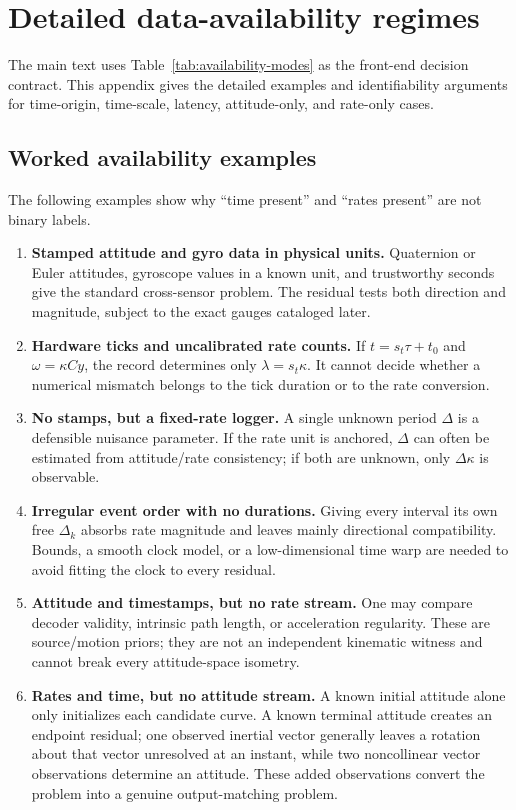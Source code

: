 \documentclass[11pt]{article}
\begin{document}
    \appendix


    \section{Detailed data-availability regimes}\label{app:availability}
    The main text uses Table~\ref{tab:availability-modes} as the front-end decision contract.
    This appendix gives the detailed examples and identifiability arguments for time-origin,
    time-scale, latency, attitude-only, and rate-only cases.

    \subsection{Worked availability examples}

    The following examples show why ``time present'' and ``rates present'' are not binary
    labels.
    \begin{enumerate}[nosep]
    \item \textbf{Stamped attitude and gyro data in physical units.}  Quaternion or Euler
    attitudes, gyroscope values in a known unit, and trustworthy seconds give the
    standard cross-sensor problem. The residual tests both direction and magnitude,
    subject to the exact gauges cataloged later.
    \item \textbf{Hardware ticks and uncalibrated rate counts.}  If
    $t=s_t\tau+t_0$ and $\omega=\kappa Cy$, the record determines only
    $\lambda=s_t\kappa$. It cannot decide whether a numerical mismatch belongs to the
    tick duration or to the rate conversion.
    \item \textbf{No stamps, but a fixed-rate logger.}  A single unknown period $\Delta$
    is a defensible nuisance parameter. If the rate unit is anchored, $\Delta$ can
    often be estimated from attitude/rate consistency; if both are unknown, only
    $\Delta\kappa$ is observable.
    \item \textbf{Irregular event order with no durations.}  Giving every interval its
    own free $\Delta_k$ absorbs rate magnitude and leaves mainly directional
    compatibility. Bounds, a smooth clock model, or a low-dimensional time warp are
    needed to avoid fitting the clock to every residual.
    \item \textbf{Attitude and timestamps, but no rate stream.}  One may compare decoder
    validity, intrinsic path length, or acceleration regularity. These are
    source/motion priors; they are not an independent kinematic witness and cannot
    break every attitude-space isometry.
    \item \textbf{Rates and time, but no attitude stream.}  A known initial attitude alone
    only initializes each candidate curve. A known terminal attitude creates an
    endpoint residual; one observed inertial vector generally leaves a rotation about
    that vector unresolved at an instant, while two noncollinear vector observations
    determine an attitude. These added observations convert the problem into a
    genuine output-matching problem.
    \end{enumerate}
\end{document}

